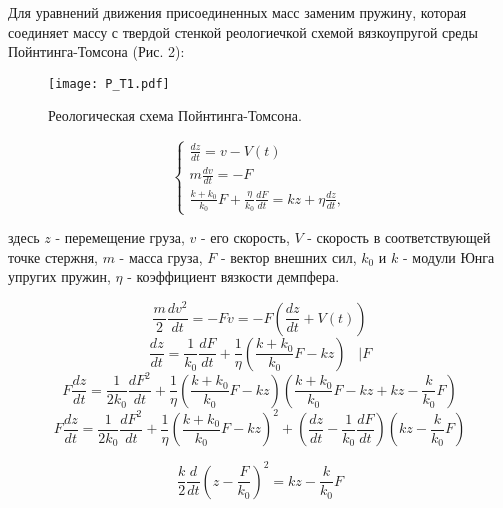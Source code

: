 \documentclass[a4paper,14pt,russian]{extreport}
\numberwithin{figure}{section}
\begin{document}
Для уравнений движения присоединенных масс заменим пружину, которая соединяет массу с твердой стенкой реологиечкой схемой вязкоупругой среды Пойнтинга-Томсона (Рис. 2):

\begin{figure}[H]
    \center        
\texttt{[image: P\_T1.pdf]}
\caption{\small Реологическая схема Пойнтинга-Томсона.}
\end{figure}
\begin{equation}
\begin{cases}
  \displaystyle \frac {dz} {dt} = v - V(t)\\
  m \displaystyle \frac {dv} {dt}=-F\\
  \displaystyle \frac {k+k_0} {k_0}F+ \frac {\eta} {k_0} \frac {dF} {dt} = kz+\eta \frac {dz} {dt},
\end{cases}
\end{equation}

здесь $z$ - перемещение груза, $v$ - его скорость, $V$ - скорость в соответствующей точке стержня, $m$ - масса груза, $F$ - вектор внешних сил, $k_0$ и $k$ - модули Юнга упругих пружин, $\eta$ - коэффициент вязкости демпфера.

\begin{equation}
  \frac {m} {2} \frac {dv^2} {dt} = -Fv =-F (\frac {dz} {dt}+ V(t))
\end{equation}
\begin{equation}
  \frac {dz} {dt} = \frac {1} {k_0} \frac {dF} {dt} + \frac {1} {\eta} (\frac {k+k_0} {k_0} F -kz)\;\;\;|F
\end{equation}
\begin{equation}
  F \frac {dz} {dt} = \frac {1} {2k_0} \frac {dF^2} {dt} + \frac {1} {\eta} (\frac {k+k_0} {k_0} F -kz)(\frac {k+k_0} {k_0} F -kz+kz-\frac{k}{k_0}F)
\end{equation}
\begin{equation}
  F \frac {dz} {dt} = \frac {1} {2k_0} \frac {dF^2} {dt} + \frac {1} {\eta} (\frac {k+k_0} {k_0} F -kz)^2+(\frac {dz} {dt} - \frac {1} {k_0} \frac {dF} {dt})(kz-\frac {k} {k_0}F)
\end{equation}

\begin{equation}
  \frac {k} {2} \frac {d} {dt} (z-\frac {F}{k_0})^2=kz-\frac {k} {k_0} F
\end{equation}
\end{document}
